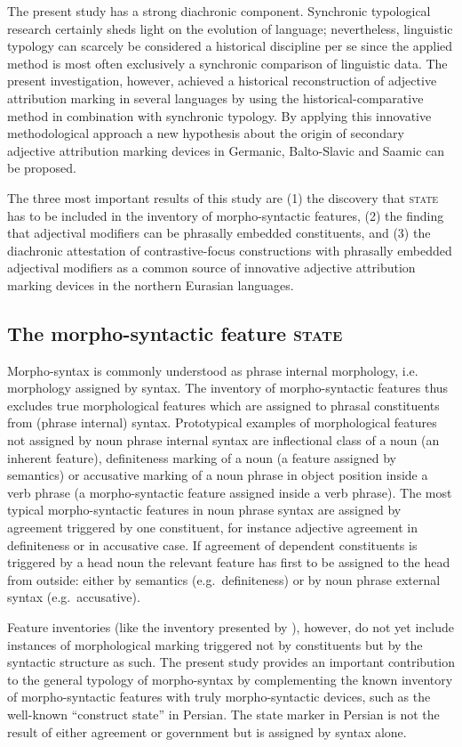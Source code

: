 The present study has a strong diachronic component. Synchronic typological research certainly sheds light on the evolution of language; nevertheless, linguistic typology can scarcely be considered a historical discipline per se since the applied method is most often exclusively a synchronic comparison of linguistic data. The present investigation, however, achieved a historical reconstruction of adjective attribution marking in several languages by using the historical-comparative method in combination with synchronic typology. By applying this innovative methodological approach a new hypothesis about the origin of secondary adjective attribution marking devices in Germanic, Balto-Slavic and Saamic can be proposed. 

The three most important results of this study are (1) the discovery that \textsc{state} has to be included in the inventory of morpho-syntactic features, (2) the finding that adjectival modifiers can be phrasally embedded constituents, and (3) the diachronic attestation of contrastive-focus constructions with phrasally embedded adjectival modifiers as a common source of innovative adjective attribution marking devices in the northern Eurasian languages.

\subsection{The morpho-syntactic feature \textsc{state}}
Morpho-syntax is commonly understood as phrase internal morphology, i.e. morphology assigned by syntax. The inventory of morpho-syntactic features thus excludes true morphological features which are assigned to phrasal constituents from (phrase internal) syntax. Prototypical examples of morphological features not assigned by noun phrase internal syntax are inflectional class of a noun (an inherent feature), definiteness marking of a noun (a feature assigned by semantics) or accusative marking of a noun phrase in object position inside a verb phrase (a morpho-syntactic feature assigned inside a verb phrase). The most typical morpho-syntactic features in noun phrase syntax are assigned by agreement triggered by one constituent, for instance adjective agreement in definiteness or in accusative case. If agreement of dependent constituents is triggered by a head noun the relevant feature has first to be assigned to the head from outside: either by semantics (e.g.~definiteness) or by noun phrase external syntax (e.g.~accusative). 

Feature inventories (like the inventory presented by \citealt{kibort2010a}), however, do not yet include instances of morphological marking triggered not by constituents but by the syntactic structure as such. The present study provides an important contribution to the general typology of morpho-syntax by complementing the known inventory of morpho-syntactic features with truly morpho-syntactic devices, such as the well-known “construct state” in Persian. The state marker in Persian is not the result of either agreement or government but is assigned by syntax alone.

